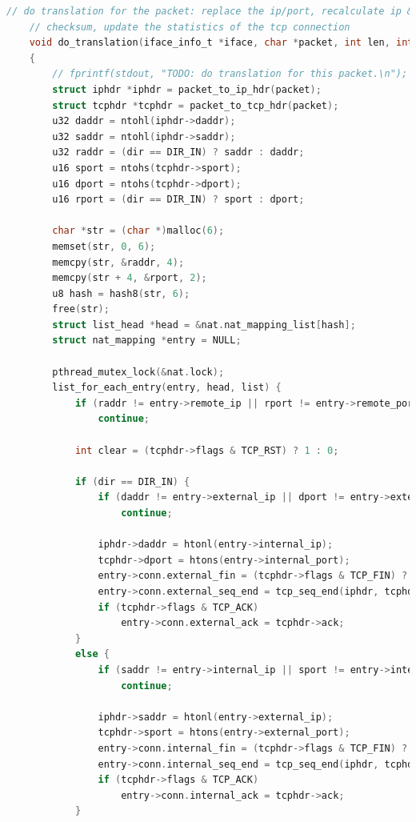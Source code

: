 \documentclass[UTF8]{report}
\begin{document}
\begin{lstlisting}[language=C]
    // do translation for the packet: replace the ip/port, recalculate ip & tcp
    // checksum, update the statistics of the tcp connection
    void do_translation(iface_info_t *iface, char *packet, int len, int dir)
    {
        // fprintf(stdout, "TODO: do translation for this packet.\n");
        struct iphdr *iphdr = packet_to_ip_hdr(packet);
        struct tcphdr *tcphdr = packet_to_tcp_hdr(packet);
        u32 daddr = ntohl(iphdr->daddr);
        u32 saddr = ntohl(iphdr->saddr);
        u32 raddr = (dir == DIR_IN) ? saddr : daddr;
        u16 sport = ntohs(tcphdr->sport);
        u16 dport = ntohs(tcphdr->dport);
        u16 rport = (dir == DIR_IN) ? sport : dport;
    
        char *str = (char *)malloc(6);
        memset(str, 0, 6);
        memcpy(str, &raddr, 4);
        memcpy(str + 4, &rport, 2);
        u8 hash = hash8(str, 6);
        free(str);
        struct list_head *head = &nat.nat_mapping_list[hash];
        struct nat_mapping *entry = NULL;
    
        pthread_mutex_lock(&nat.lock);
        list_for_each_entry(entry, head, list) {
            if (raddr != entry->remote_ip || rport != entry->remote_port)
                continue;
    
            int clear = (tcphdr->flags & TCP_RST) ? 1 : 0;
    
            if (dir == DIR_IN) {
                if (daddr != entry->external_ip || dport != entry->external_port)
                    continue;
    
                iphdr->daddr = htonl(entry->internal_ip);
                tcphdr->dport = htons(entry->internal_port);
                entry->conn.external_fin = (tcphdr->flags & TCP_FIN) ? 1 : 0;
                entry->conn.external_seq_end = tcp_seq_end(iphdr, tcphdr);
                if (tcphdr->flags & TCP_ACK)
                    entry->conn.external_ack = tcphdr->ack;
            } 
            else {
                if (saddr != entry->internal_ip || sport != entry->internal_port)
                    continue;
    
                iphdr->saddr = htonl(entry->external_ip);
                tcphdr->sport = htons(entry->external_port);
                entry->conn.internal_fin = (tcphdr->flags & TCP_FIN) ? 1 : 0;
                entry->conn.internal_seq_end = tcp_seq_end(iphdr, tcphdr);
                if (tcphdr->flags & TCP_ACK)
                    entry->conn.internal_ack = tcphdr->ack;
            }
    

\end{lstlisting}
\end{document}
